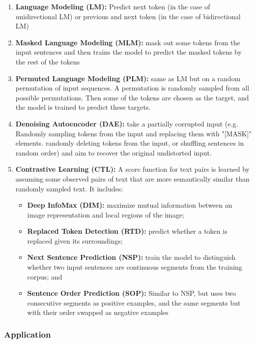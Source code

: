 \documentclass{article}
\begin{document}
\begin{enumerate}
    \item \textbf{Language Modeling (LM):} Predict next token (in the case of unidirectional LM) or previous and next token (in the case of bidirectional LM)
    \item \textbf{Masked Language Modeling (MLM):} mask out some tokens from the input sentences and then trains the model to predict the masked tokens by the rest of the tokens
    \item \textbf{Permuted Language Modeling (PLM):} same as LM but on a random permutation of input sequences. A permutation is randomly sampled from all possible permutations. Then some of the tokens are chosen as the target, and the model is trained to predict these targets.
    \item \textbf{Denoising Autoencoder (DAE):} take a partially corrupted input (e.g. Randomly sampling tokens from the input and replacing them with "[MASK]" elements. randomly deleting tokens from the input, or shuffling sentences in random order) and aim to recover the original undistorted input.
    \item \textbf{Contrastive Learning (CTL):} A score function for text pairs is learned by assuming some observed pairs of text that are more semantically similar than randomly sampled text. It includes: 
    \begin{itemize}
       \item \textbf{Deep InfoMax (DIM):} maximize mutual information between an image representation and local regions of the image; 
       \item \textbf{Replaced Token Detection (RTD):} predict whether a token is replaced given its surroundings; 
       \item \textbf{Next Sentence Prediction (NSP):} train the model to distinguish whether two input sentences are continuous segments from the training corpus; and 
       \item \textbf{Sentence Order Prediction (SOP):} Similar to NSP, but uses two consecutive segments as positive examples, and the same segments but with their order swapped as negative examples
   \end{itemize} 
   
\end{enumerate}

\subsubsection{Application}
\end{document}
